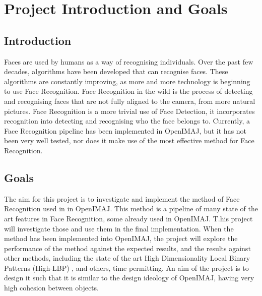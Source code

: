 \documentclass[12pt, a4paper]{article}
\begin{document}
        \newpage
       
 
 
       
        \tableofcontents
       
 
 
        \newpage
 \section{Project Introduction and Goals}
 \subsection{Introduction}
 Faces are used by humans as a way of recognising individuals. Over the past few decades, algorithms have been developed that can recognise faces. These algorithms are constantly improving, as more and more technology is beginning to use Face Recognition. Face Recognition in the wild is the process of detecting and recognising faces that are not fully aligned to the camera, from more natural pictures. Face Recognition is a more trivial use of Face Detection, it incorporates recognition into detecting and recognising who the face belongs to. Currently, a Face Recognition pipeline has been implemented in OpenIMAJ, but it has not been very well tested, nor does it make use of the most effective method for Face Recognition.

 \subsection{Goals}
The aim for this project is to investigate and implement the method of Face Recognition used in \cite{simonyan2004fisher} in OpenIMAJ. This method is a pipeline of many state of the art features in Face Recognition, some already used in OpenIMAJ. T.his project will investigate those and use them in the final implementation. When the method has been implemented into OpenIMAJ, the project will explore the performance of the method against the expected results, and the results against other methods, including the state of the art High Dimensionality Local Binary Patterns (High-LBP) \cite{highlbpsift}, and others, time permitting. An aim of the project is to design it such that it is similar to the design ideology of OpenIMAJ, having very high cohesion between objects.
\end{document}
